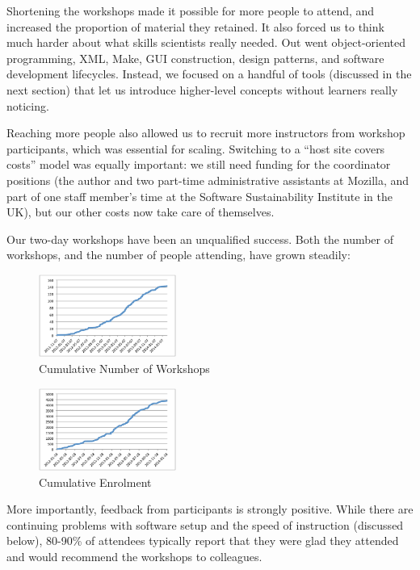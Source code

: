 \documentclass[10pt,a4paper,twocolumn]{article}
\begin{document}
Shortening the workshops made it possible for more people to attend,
and increased the proportion of material they retained. It also forced
us to think much harder about what skills scientists really
needed. Out went object-oriented programming, XML, Make, GUI
construction, design patterns, and software development
lifecycles. Instead, we focused on a handful of tools (discussed in
the next section) that let us introduce higher-level concepts without
learners really noticing.

Reaching more people also allowed us to recruit more instructors from
workshop participants, which was essential for scaling. Switching to a
``host site covers costs'' model was equally important: we still need
funding for the coordinator positions (the author and two part-time
administrative assistants at Mozilla, and part of one staff member's
time at the Software Sustainability Institute in the UK), but our
other costs now take care of themselves.

Our two-day workshops have been an unqualified success. Both the number
of workshops, and the number of people attending, have grown steadily:

\begin{figure}
\centering
\includegraphics[width=0.4\textwidth]{workshops.eps}
\caption{\label{f:workshops}Cumulative Number of Workshops}
\end{figure}

\begin{figure}
\centering
\includegraphics[width=0.4\textwidth]{enrolment.eps}
\caption{\label{f:enrolment}Cumulative Enrolment}
\end{figure}

More importantly, feedback from participants is strongly positive. While
there are continuing problems with software setup and the speed of
instruction (discussed below), 80-90\% of attendees typically report
that they were glad they attended and would recommend the workshops to
colleagues.
\end{document}
